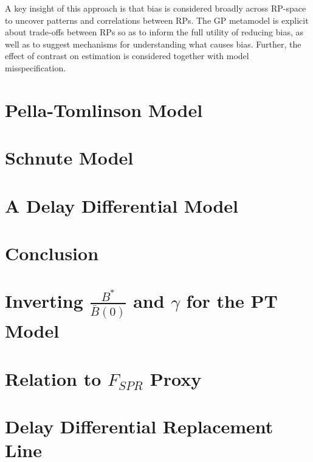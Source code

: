 \documentclass[12pt]{ucscthesis}
\begin{document}
{%
A key insight of this approach is that bias is considered broadly across RP-space to
uncover patterns and correlations between RPs. %
The GP metamodel is explicit about trade-offs between RPs %
so as to inform the full utility of reducing bias, as well as to suggest mechanisms for
understanding what causes bias. Further, the effect of contrast on estimation
is considered together with model misspecification. %

}

%
\chapter{Pella-Tomlinson Model}


%
\chapter{Schnute Model \label{schnuteChapter}}
%



%
\chapter{A Delay Differential Model}
%
%


%
\chapter{\color{red} Conclusion}

%
\appendix

%
\chapter{Inverting $\frac{B^*}{\bar B(0)}$ and $\gamma$ for the PT Model \label{lambApp}}


%
\chapter{\color{red}Relation to $F_{SPR}$ Proxy}


%
\chapter{Delay Differential Replacement Line}

\end{document}
